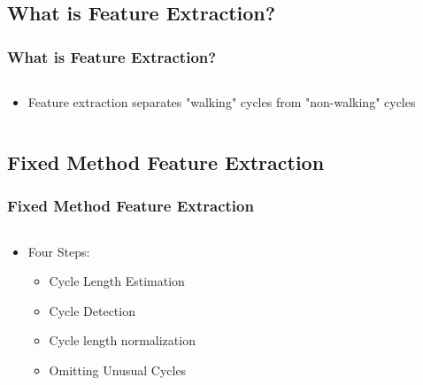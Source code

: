 \documentclass{beamer}
\begin{document}
\subsection{What is Feature Extraction?}
\begin{frame}
  \frametitle{What is Feature Extraction?}
  \begin{columns}
  \begin{column}{.9\textwidth}
  \begin{itemize}
  	\item Feature extraction separates "walking" cycles from "non-walking" cycles
  \end{itemize}
  \end{column}
  \begin{column}{0.6\textwidth}
       \\
  \end{column}
  \end{columns}
\end{frame}

\subsection{Fixed Method Feature Extraction}
\begin{frame}
  \frametitle{Fixed Method Feature Extraction}
  \begin{columns}
  \begin{column}{.5\textwidth}
  \begin{itemize}
  	\item Four Steps:
  	\begin{itemize}
  		\item Cycle Length Estimation
  		\linebreak
  		\item Cycle Detection
  		\linebreak
  		\item Cycle length normalization
  		\linebreak
  		\item Omitting Unusual Cycles
  	\end{itemize}
  \end{itemize}
  \end{column}
  \begin{column}{0.6\textwidth}
       \\
  \end{column}
  \end{columns}
\end{frame}
\end{document}
